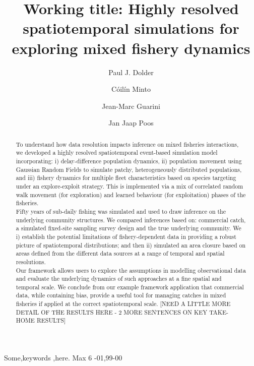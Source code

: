 \documentclass[review]{elsarticle}
\begin{document}
\begin{frontmatter}
\title{Working title: Highly resolved spatiotemporal simulations for
	exploring mixed fishery dynamics}

\author[1,2]{Paul J. Dolder}

\author[1]{Cóilín Minto}
\author[3]{Jean-Marc Guarini}
\author[4,5]{Jan Jaap Poos}

\address[1]{Galway-Mayo Institute of Technology (GMIT), Dublin Road, Galway,
	Ireland} 
\address[2]{Centre for Environment, Fisheries and Aquaculture Science (Cefas),
	Pakefield Road, Lowestoft, UK}
\address[3]{, 4 Place Jussieu,
	75005 Paris, France}
\address[4]{Wageningen Marine Research, Haringkade 1 1976 CP IJmuiden,
	Netherlands}
\address[5]{Aquaculture and Fisheries Group, Wageningen University \& Research,
	Zodiac Building 122, De Elst 1, 6708 WD Wageningen, the Netherlands}


\begin{abstract}

To understand how data resolution impacts inference on mixed fisheries
interactions, we developed a highly resolved spatiotemporal
event-based simulation model incorporating: i) delay-difference
population dynamics, ii) population movement using Gaussian Random Fields to
simulate patchy, heterogeneously distributed populations, and iii) fishery
dynamics for multiple fleet characteristics based on species targeting under an
explore-exploit strategy. This is implemented via a mix of correlated random
walk movement (for exploration) and learned behaviour (for exploitation) phases
of the fisheries.  \\ 
Fifty years of sub-daily fishing was simulated and used to draw inference on
the underlying community structures. We compared inferences based on:
commercial catch, a simulated fixed-site sampling survey design and the true
underlying community. We i) establish the potential limitations of
fishery-dependent data in providing a robust picture of spatiotemporal
distributions; and then ii) simulated an area closure based on areas defined
from the different data sources at a range of temporal and spatial resolutions.
\\
Our framework allows users to explore the assumptions in modelling
observational data and evaluate the underlying dynamics of such approaches at a
fine spatial and temporal scale. We conclude from our example framework
application that commercial data, while containing bias, provide a useful tool
for managing catches in mixed fisheries if applied at the correct
spatiotemporal scale. [NEED A LITTLE MORE DETAIL OF THE RESULTS HERE - 2 MORE
SENTENCES ON KEY TAKE-HOME RESULTS]\\
\end{abstract}

\begin{keyword}
Some\sep keywords \sep here. Max 6 
-01\sep  99-00
\end{keyword}

\end{frontmatter}
\end{document}
